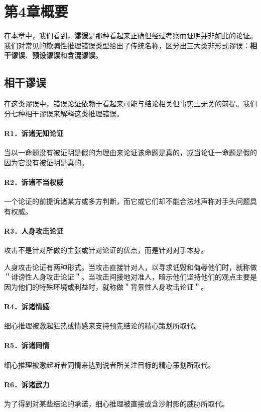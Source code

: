 \section*{第4章概要}
在本章中，我们看到，\textbf{谬误}是那种看起来正确但经过考察而证明并非如此的论证。我们对常见的欺骗性推理错误类型给出了传统名称，区分出三大类非形式谬误：\textbf{相干谬误}、\textbf{预设谬误}和\textbf{含混谬误}。

\subsection*{相干谬误}
在这类谬误中，错误论证依赖于看起来可能与结论相关但事实上无关的前提。我们分七种相干谬误来解释这类推理错误。

\paragraph{R1．诉诸无知论证}
当以一命题没有被证明是假的为理由来论证该命题是真的，或当论证一命题是假的因为它没有被证明是真的。

\paragraph{R2．诉诸不当权威}
一个论证的前提诉诸某方或多方判断，而它或它们却不能合法地声称对手头问题具有权威。

\paragraph{R3．人身攻击论证}
攻击不是针对所做的主张或针对论证的优点，而是针对对手本身。

人身攻击论证有两种形式。当攻击直接针对人，以寻求诋毁和侮辱他们时，就称做＂诽谤性人身攻击论证＂。当攻击间接地对准人，暗示他们坚持他们的观点主要是因为他们的特殊环境或利益时，就称做＂背景性人身攻击论证＂。

\paragraph{R4．诉诸情感}
细心推理被激起狂热或情感来支持预先结论的精心策划所取代。

\paragraph{R5．诉诸同情}
细心推理被激起听者同情来达到说者所关注目标的精心策划所取代。

\paragraph{R6．诉诸武力}
为了得到对某些结论的承诺，细心推理被直接或含沙射影的威胁所取代。

